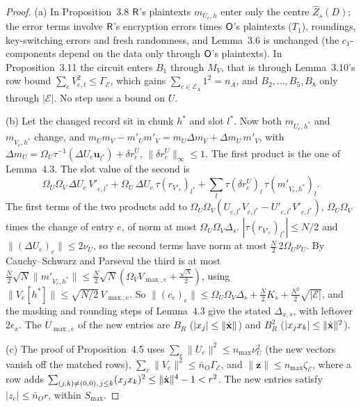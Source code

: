 \begin{proof}
(a) In Proposition~3.8 $\mathsf{R}$'s plaintexts $m_{U_e,h}$ enter only the centre $\widehat Z_s(D)$; the error terms involve $\mathsf{R}$'s encryption errors times $\mathsf{O}$'s plaintexts ($T_1$), roundings, key-switching errors and fresh randomness, and Lemma~3.6 is unchanged (the $c_1$-components depend on the data only through $\mathsf{O}$'s plaintexts). In Proposition~3.11 the circuit enters $B_1$ through $M_V$, that is through Lemma~3.10's row bound $\sum_eV_{e,t}^2\le\Gamma_{\mathcal E}$, which gains $\sum_{e\in\mathcal E_A}1^2=n_A$, and $B_2,\dots,B_5,B_8$ only through $|\mathcal E|$. No step uses a bound on $U$.

(b) Let the changed record sit in chunk $h^*$ and slot $l^*$. Now both $m_{U_e,h^*}$ and $m_{V_e,h^*}$ change, and $m_Um_V-m'_Um'_V=m_U\Delta m_V+\Delta m_U\,m'_V$, with $\Delta m_U=\Omega_U\tau^{-1}(\Delta U_e\mathbf u_{l^*})+\delta r^U_e$, $\lVert \delta r^U_e\rVert_\infty\le1$. The first product is the one of Lemma~4.3. The slot value of the second is
\[
  \Omega_U\Omega_V\,\Delta U_e\,V'_{e,l^*}+\Omega_U\,\Delta U_e\,\tau(r_{V'_e})_{l^*}+\sum_l\tau(\delta r^U_e)_l\,\tau(m'_{V_e,h^*})_l .
\]
The first terms of the two products add to $\Omega_U\Omega_V(U_{e,l^*}V_{e,l^*}-U'_{e,l^*}V'_{e,l^*})$, $\Omega_U\Omega_V$ times the change of entry $e$, of norm at most $\Omega_U\Omega_V\Delta_s$. $|\tau(r_{V'_e})_{l^*}|\le N/2$ and $\lVert (\Delta U_e)_e\rVert\le2\nu_U$, so the second terms have norm at most $\tfrac N2\,2\Omega_U\nu_U$. By Cauchy--Schwarz and Parseval the third is at most $\tfrac N2\sqrt N\lVert m'_{V_e,h^*}\rVert\le\tfrac N2\sqrt N(\Omega_VV_{\max,e}+\tfrac{\sqrt N}2)$, using $\lVert V_e[h^*]\rVert\le\sqrt{N/2}\,V_{\max,e}$. So $\lVert (c_e)_e\rVert\le\Omega_U\Omega_V\Delta_s+\tfrac N2K_s+\tfrac{N^2}2\sqrt{|\mathcal E|}$, and the masking and rounding steps of Lemma~4.3 give the stated $\Delta_{x,s}$, with leftover $2\epsilon_x$. The $U_{\max,e}$ of the new entries are $B_R$ ($|x_j|\le\lVert \dot{\mathbf{x}}\rVert$) and $B_R^2$ ($|x_jx_k|\le\lVert \dot{\mathbf{x}}\rVert^2$).

(c) The proof of Proposition~4.5 uses $\sum_e\lVert U_e\rVert^2\le n_{\max}\nu_U^2$ (the new vectors vanish off the matched rows), $\sum_e\lVert V_e\rVert^2\le\bar n_O\Gamma_{\mathcal E}$, and $\lVert \mathbf z\rVert\le n_{\max}\zeta_{\mathcal E}$, where a row adds $\sum_{(j,k)\ne(0,0),\,j\le k}(x_jx_k)^2\le\lVert \dot{\mathbf{x}}\rVert^4-1<r^2$. The new entries satisfy $|z_e|\le\bar n_Or$, within $S_{\max}$.
\end{proof}

